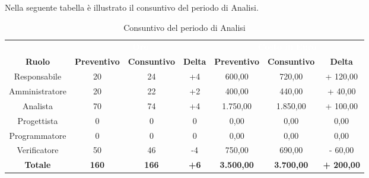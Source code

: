 Nella seguente tabella è illustrato il consuntivo del periodo di Analisi.

\begin{table}[H]
\centering
\begin{tabular}{c|ccc|ccc}
\rowcolor{greySWEight}
\multicolumn{1}{c}{} & \multicolumn{3}{c}{\textcolor{white}{\textbf{Ore}}} & \multicolumn{3}{c}{\textcolor{white}{\textbf{Costo in Euro}}} \\
{\textbf{Ruolo}} & {\textbf{Preventivo}} & {\textbf{Consuntivo}} & {\textbf{Delta}} & {\textbf{Preventivo}} & {\textbf{Consuntivo}} & {\textbf{Delta}} \\
Responsabile & 20 & 24 & +4 &  600,00 &  720,00 & + 120,00 \\
Amministratore & 20 & 22 & +2 &  400,00 &  440,00 & + 40,00 \\
Analista & 70 & 74 & +4 &  1.750,00 &  1.850,00 & + 100,00 \\
Progettista & 0 & 0 & 0 &  0,00 &  0,00 &  0,00 \\
Programmatore & 0 & 0 & 0 &  0,00 &  0,00 &  0,00 \\
Verificatore & 50 & 46 & -4 &  750,00 &  690,00 & - 60,00 \\
\hline
\textbf{Totale} & \textbf{160} & \textbf{166} & \textbf{+6} &  \textbf{3.500,00} &  \textbf{3.700,00} & \textbf{+ 200,00} \\


\end{tabular}
\caption{Consuntivo del periodo di Analisi}
\end{table}
